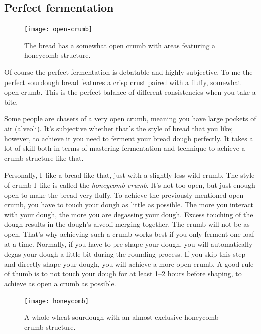 \subsection{Perfect fermentation}

\begin{figure}
  \texttt{[image: open-crumb]}
  \caption{The bread has a somewhat open crumb with areas
  featuring a honeycomb structure.}%
  \label{fig:open-crumb}
\end{figure}

Of course the perfect fermentation is debatable and highly subjective. To
me the perfect sourdough bread features a crisp crust paired with a fluffy,
somewhat open crumb. This is the perfect balance of different consistencies
when you take a bite.

Some people are chasers of a very open crumb, meaning you have large pockets
of air (alveoli). It's subjective whether that's the style of bread that you like;
however, to achieve it you need to ferment your bread dough perfectly.
It takes a lot of skill both in terms of mastering fermentation and technique
to achieve a crumb structure like that.

Personally, I~like a bread like that, just with a slightly less wild crumb.
The style of crumb I~like is called the \emph{honeycomb crumb}. It's not too open, but
just enough open to make the bread very fluffy. To achieve the previously mentioned open crumb, you
have to touch your dough as little as possible. The more you interact with your
dough, the more you are degassing your dough. Excess touching of the dough
results in the dough's alveoli merging together. The crumb will not be as open.
That's why achieving such a crumb works best if you only ferment
one loaf at a time. Normally, if you have to pre-shape your dough,
you will automatically degas your dough a little bit during the rounding process.
If you skip this step and directly shape your dough, you will achieve a more open crumb.
A good rule of thumb is to not touch your dough for at least 1--2 hours before shaping,
to achieve as open a crumb as possible.

\begin{figure}
  \texttt{[image: honeycomb]}
  \caption{A whole wheat sourdough with an almost exclusive honeycomb crumb
  structure.}%
  \label{fig:honeycomb}
\end{figure}


